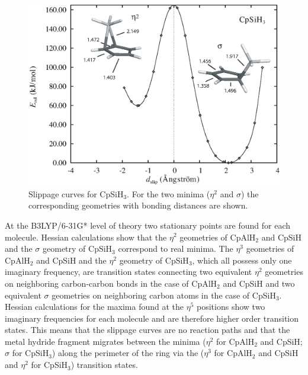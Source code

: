 \begin{figure}[hbtp]
\center
\includegraphics[scale=0.80]{cyclopentadienyl/figures/cpsih3.eps}
\caption{Slippage curves for CpSiH$_3$. For the two minima ($\eta^2$ and $\sigma$) the corresponding geometries with bonding distances are shown.}
\label{ch4.fig.slip_cpsih3}
\end{figure}
At the B3LYP/6-31G* level of theory two stationary points are found for each molecule. Hessian calculations show that the $\eta^2$ geometries of CpAlH$_2$ and CpSiH and the $\sigma$ geometry of CpSiH$_3$ correspond to real minima. The $\eta^3$ geometries of CpAlH$_2$ and CpSiH and the $\eta^2$ geometry of CpSiH$_3$, which all possess only one imaginary frequency, are transition states connecting two equivalent $\eta^2$ geometries on neighboring carbon-carbon bonds in the case of CpAlH$_2$ and CpSiH and two equivalent $\sigma$ geometries on neighboring carbon atoms in the case of CpSiH$_3$. Hessian calculations for the maxima found at the $\eta^5$ positions show two imaginary frequencies for each molecule and are therefore higher order transition states. This means that the slippage curves are no reaction paths and that the metal hydride fragment migrates between the minima ($\eta^2$ for CpAlH$_2$ and CpSiH; $\sigma$ for CpSiH$_3$) along the perimeter of the ring via the ($\eta^3$ for CpAlH$_2$ and CpSiH and $\eta^2$ for CpSiH$_3$) transition states.


